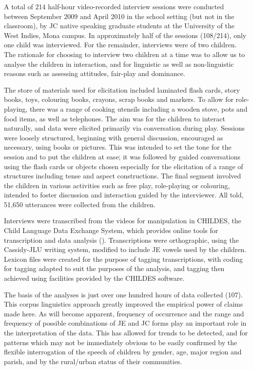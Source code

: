 \documentclass[output=paper,colorlinks,citecolor=brown]{langscibook}
\begin{document}
A total of 214 half-hour video-recorded interview sessions were conducted between  September 2009 and April 2010 in the school setting (but not in the classroom), by JC native speaking graduate students at the University of the West Indies, Mona campus.  In approximately half of the sessions (108/214), only one child was interviewed. For the remainder, interviews were of two children. The rationale for choosing to interview two children at a time was to allow us to analyse the children in interaction, and for linguistic as well as non-linguistic reasons such as assessing attitudes, fair-play and dominance.

The store of materials used for elicitation included laminated flash cards, story books, toys, colouring books, crayons, scrap books and markers. To allow for role-playing, there was a range of cooking utensils including a wooden stove, pots and food items, as well as telephones. The aim was for the children to interact naturally, and data were elicited primarily via conversation during play. Sessions were loosely structured, beginning with general discussion, encouraged as necessary, using books or pictures. This was intended to set the tone for the session and to put the children at ease; it was followed by guided conversations using the flash cards or objects chosen especially for the elicitation of a range of structures including tense and aspect constructions. The final segment involved the children in various activities such as free play, role-playing or colouring, intended to foster discussion and interaction guided by the interviewer. All told, 51,650 utterances were collected from the children.

Interviews were transcribed from the videos for manipulation in CHILDES, the Child Language Data Exchange System, which provides online tools for transcription and data analysis (\citealt{MacWhinneydatabase2000,MacWhinneyTools2000}). Transcriptions were orthographic, using the Cassidy-JLU writing system, modified to include JE vowels used by the children. Lexicon files were created for the purpose of tagging transcriptions, with coding for tagging adapted to suit the purposes of the analysis, and tagging then achieved using facilities provided by the CHILDES software.

The basis of the analyses is just over one hundred hours of data collected (107). This corpus linguistics approach greatly improved the empirical power of claims made here. As will become apparent, frequency of occurrence and the range and frequency of possible combinations of JE and JC forms play an important role in the interpretation of the data. This has allowed for trends to be detected, and for patterns which may not be immediately obvious to be easily confirmed by the flexible interrogation of the speech of children by gender, age, major region and parish, and by the rural\slash urban status of their communities.
\end{document}
